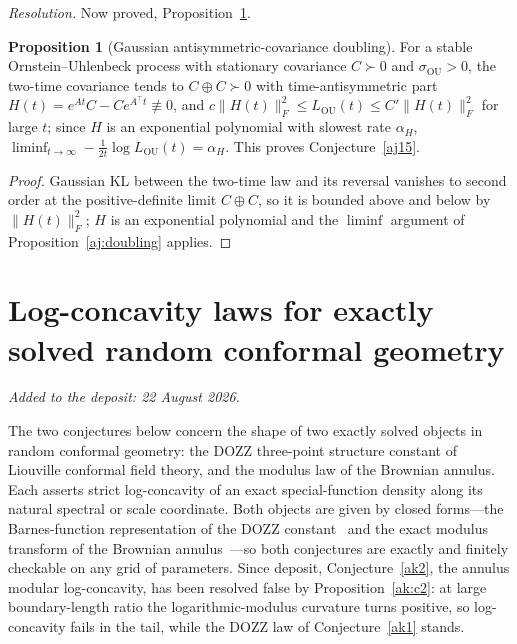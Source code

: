 \documentclass[11pt]{article}
\theoremstyle{definition}
\newtheorem{proposition}{Proposition}
\begin{document}
\emph{Resolution.} Now proved, Proposition~\ref{aj:oudoubling}.

\begin{proposition}[Gaussian antisymmetric-covariance doubling]\label{aj:oudoubling}
For a stable Ornstein--Uhlenbeck process with stationary covariance $C\succ0$ and $\sigma_{\mathrm{OU}}>0$, the two-time covariance tends to $C\oplus C\succ0$ with time-antisymmetric part $H(t)=e^{At}C-Ce^{A^\top t}\not\equiv0$, and $c\|H(t)\|_F^2\le L_{\mathrm{OU}}(t)\le C'\|H(t)\|_F^2$ for large $t$; since $H$ is an exponential polynomial with slowest rate $\alpha_H$, $\liminf_{t\to\infty}-\tfrac1{2t}\log L_{\mathrm{OU}}(t)=\alpha_H$.  This proves Conjecture~\ref{aj15}.
\end{proposition}

\begin{proof}
Gaussian KL between the two-time law and its reversal vanishes to second order at the positive-definite limit $C\oplus C$, so it is bounded above and below by $\|H(t)\|_F^2$; $H$ is an exponential polynomial and the $\liminf$ argument of Proposition~\ref{aj:doubling} applies.
\end{proof}




\part{Log-concavity laws for exactly solved random conformal geometry}

\medskip\noindent\emph{Added to the deposit: 22 August 2026.}\par\medskip

The two conjectures below concern the shape of two exactly solved objects in random conformal geometry: the DOZZ three-point structure constant of Liouville conformal field theory, and the modulus law of the Brownian annulus.  Each asserts strict log-concavity of an exact special-function density along its natural spectral or scale coordinate.  Both objects are given by closed forms---the Barnes-function representation of the DOZZ constant~\cite{KRV20} and the exact modulus transform of the Brownian annulus~\cite{ARS22}---so both conjectures are exactly and finitely checkable on any grid of parameters.  Since deposit, Conjecture~\ref{ak2}, the annulus modular log-concavity, has been resolved false by Proposition~\ref{ak:c2}: at large boundary-length ratio the logarithmic-modulus curvature turns positive, so log-concavity fails in the tail, while the DOZZ law of Conjecture~\ref{ak1} stands.
\end{document}
